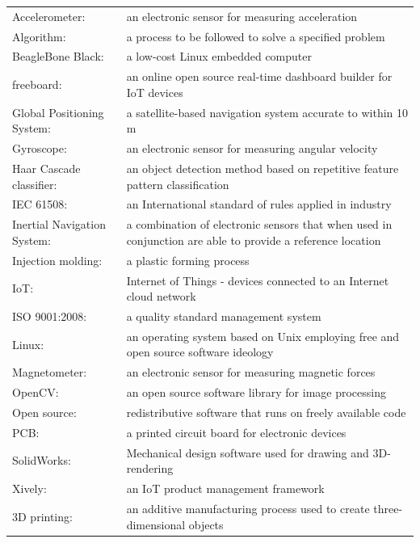 \begin{tabular}{p{}k{0.7\textwidth}}%
	Accelerometer:      & an electronic sensor for measuring acceleration\\
    Algorithm: & a process to be followed to solve a specified problem\\
    BeagleBone Black: & a low-cost Linux embedded computer\\
    freeboard: & an online open source real-time dashboard builder for IoT devices\\
    Global Positioning System:	&	a satellite-based navigation system accurate to within 10 m \\
	Gyroscope: & an electronic sensor for measuring angular velocity\\
    Haar Cascade classifier: & an object detection method based on repetitive feature pattern classification\\
    IEC 61508: & an International standard of rules applied in industry\\
    Inertial Navigation System:	&	a combination of electronic sensors that when used in conjunction are able to provide a reference location\\
    Injection molding: & a plastic forming process\\
    IoT: & Internet of Things - devices connected to an Internet cloud network\\
    ISO 9001:2008: & a quality standard management system\\
    Linux: & an operating system based on Unix employing free and open source software ideology\\
	Magnetometer:   & an electronic sensor for measuring magnetic forces\\
    OpenCV: & an open source software library for image processing\\
    Open source: & redistributive software that runs on freely available code\\
    PCB: & a printed circuit board for electronic devices\\
    SolidWorks: & Mechanical design software used for drawing and 3D-rendering\\
    Xively: & an IoT product management framework\\
    3D printing: & an additive manufacturing process used to create three-dimensional objects\\
    

\end{tabular}
\newpage

